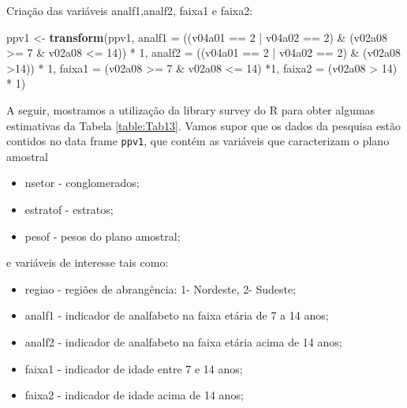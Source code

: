 \documentclass[]{book}
\newenvironment{Shaded}{\begin{snugshade}}{\end{snugshade}}
\newcommand{\KeywordTok}[1]{\textcolor[rgb]{0.13,0.29,0.53}{\textbf{{#1}}}}
\newcommand{\DataTypeTok}[1]{\textcolor[rgb]{0.13,0.29,0.53}{{#1}}}
\newcommand{\DecValTok}[1]{\textcolor[rgb]{0.00,0.00,0.81}{{#1}}}
\newcommand{\StringTok}[1]{\textcolor[rgb]{0.31,0.60,0.02}{{#1}}}
\newcommand{\NormalTok}[1]{{#1}}
\providecommand{\tightlist}{%
  \setlength{\itemsep}{0pt}\setlength{\parskip}{0pt}}
\numberwithin{example}{chapter}
\numberwithin{remark}{chapter}
\numberwithin{definition}{chapter}
\begin{document}
Criação das variáveis analf1,analf2, faixa1 e faixa2:

\begin{Shaded}
\begin{Highlighting}[]
\NormalTok{ppv1 <-}\StringTok{ }\KeywordTok{transform}\NormalTok{(ppv1, }\DataTypeTok{analf1 =} \NormalTok{((v04a01 ==}\StringTok{ }\DecValTok{2} \NormalTok{|}\StringTok{    }\NormalTok{v04a02 ==}\StringTok{ }\DecValTok{2}\NormalTok{) &}\StringTok{ }\NormalTok{(v02a08 >=}\StringTok{ }\DecValTok{7} \NormalTok{&}\StringTok{ }
\NormalTok{v02a08 <=}\StringTok{ }\DecValTok{14}\NormalTok{)) *}\StringTok{   }\DecValTok{1}\NormalTok{, }\DataTypeTok{analf2 =} \NormalTok{((v04a01 ==}\StringTok{ }\DecValTok{2} \NormalTok{|}\StringTok{ }\NormalTok{v04a02 ==}\StringTok{ }\DecValTok{2}\NormalTok{) &}\StringTok{ }
\NormalTok{(v02a08 >}\DecValTok{14}\NormalTok{)) *}\StringTok{ }\DecValTok{1}\NormalTok{, }\DataTypeTok{faixa1 =} \NormalTok{(v02a08 >=}\StringTok{ }\DecValTok{7} \NormalTok{&}\StringTok{ }\NormalTok{v02a08 <=}\StringTok{ }\DecValTok{14}\NormalTok{) *}\DecValTok{1}\NormalTok{, }\DataTypeTok{faixa2 =} \NormalTok{(v02a08 >}\StringTok{ }\DecValTok{14}\NormalTok{) *}\StringTok{ }\DecValTok{1}\NormalTok{)}
\end{Highlighting}
\end{Shaded}

A seguir, mostramos a utilização da library survey do R para obter
algumas estimativas da Tabela \ref{table:Tab13}. Vamos supor que os
dados da pesquisa estão contidos no data frame \texttt{ppv1}, que contém
as variáveis que caracterizam o plano amostral

\begin{itemize}
\tightlist
\item
  nsetor - conglomerados;
\item
  estratof - estratos;
\item
  pesof - pesos do plano amostral;
\end{itemize}

e variáveis de interesse tais como:

\begin{itemize}
\tightlist
\item
  regiao - regiões de abrangência: 1- Nordeste, 2- Sudeste;
\item
  analf1 - indicador de analfabeto na faixa etária de 7 a 14 anos;
\item
  analf2 - indicador de analfabeto na faixa etária acima de 14 anos;
\item
  faixa1 - indicador de idade entre 7 e 14 anos;
\item
  faixa2 - indicador de idade acima de 14 anos;
\end{itemize}
\end{document}
